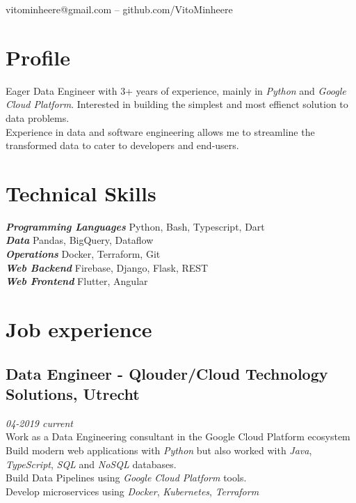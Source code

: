 \documentclass{article}
\makeatletter
\renewcommand{\maketitle}{
\begin{center}
	{\huge\bfseries
	\theauthor}

\vspace*{1cm}
vitominheere@gmail.com -- github.com/VitoMinheere

\end{center}
}
\makeatother
\begin{document}
\author{Vito Minheere}


\maketitle

\section{\sc Profile}
Eager Data Engineer with 3+ years of experience, mainly in \emph{Python} and \emph{Google Cloud Platform}. Interested in building the simplest and most effienct solution to data problems. \\
Experience in data and software engineering allows me to streamline the transformed data to cater to developers and end-users.

\section{\sc Technical Skills}
{\sl \textbf{Programming Languages}} Python, Bash, Typescript, Dart \\
{\sl \textbf{Data }} Pandas, BigQuery, Dataflow \\
{\sl \textbf{Operations }} Docker, Terraform, Git \\
{\sl \textbf{Web Backend }} Firebase, Django, Flask, REST \\
{\sl \textbf{Web Frontend }} Flutter, Angular \\

\section{\sc Job experience}
\subsection{Data Engineer - Qlouder/Cloud Technology Solutions, Utrecht} \hfill {\em 04-2019 current} \\
Work as a Data Engineering consultant in the Google Cloud Platform ecosystem \\
Build modern web applications with \emph{Python} but also worked with \emph{Java}, \emph{TypeScript}, \emph{SQL} and \emph{NoSQL} databases. \\
Build Data Pipelines using \emph{Google Cloud Platform} tools. \\
Develop microservices using \emph{Docker}, \emph{Kubernetes}, \emph{Terraform} \\
\end{document}
